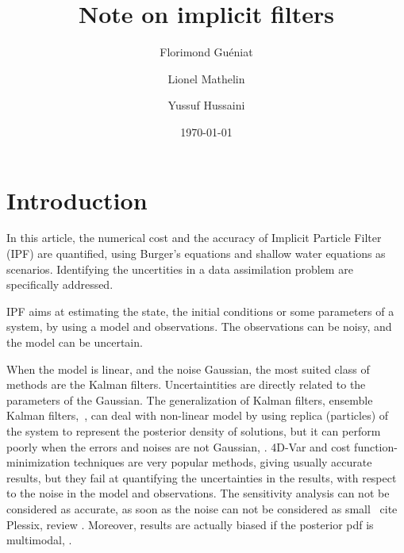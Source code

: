 \documentclass[aip,pof,nofootinbib,reprint,onecolumn]{revtex4-1}
\newcommand{\todo}[1]{{\color{red} #1 }}
\begin{document}
%

\title{Note on implicit filters}


\author{Florimond Gu\'eniat}
\author{Lionel Mathelin}
\author{Yussuf Hussaini}



\date{\today}




\begin{abstract}


\end{abstract}


\maketitle



%
\section{Introduction}
\label{sec-intro}

In this article, the numerical cost and the accuracy of Implicit Particle Filter (IPF) are quantified, using Burger's equations and shallow water equations as scenarios.
Identifying the uncertities in a data assimilation problem are specifically addressed.

IPF aims at estimating the state, the initial conditions or some parameters of a system, by using a model and observations. The observations can be noisy, and the model can be uncertain.

When the model is linear, and the noise Gaussian, the most suited class of methods are the Kalman filters. Uncertaintities are directly related to the parameters of the Gaussian. The generalization of Kalman filters, ensemble Kalman filters,~\cite{Evensen2009}, can deal with non-linear model by using replica (particles) of the system to represent the posterior density of solutions, but it can perform poorly when the errors and noises are not Gaussian, \cite{Miller1999}. 
4D-Var and cost function-minimization techniques are very popular methods, giving usually accurate results, but they fail at quantifying the uncertainties in the results, with respect to the noise in the model and observations. 
The sensitivity analysis can not be considered as accurate, as soon as the noise can not be considered as small~\todo{cite Plessix, review}.
Moreover, results are actually biased if the posterior pdf is multimodal, \cite{Rabier1992}.
\end{document}
